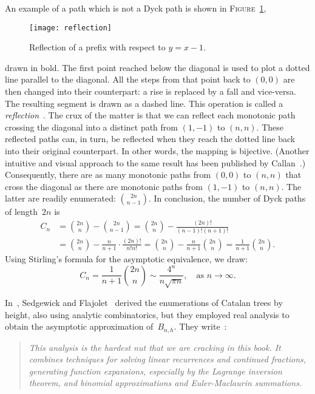 \documentclass[11pt]{article}
\newcommand\fig{\textsc{Figure}}
\begin{document}
An example of a path which is not a Dyck path is shown in
\fig~\ref{fig:reflection},
\begin{figure}[b]
\centering
\texttt{[image: reflection]}
\caption{Reflection of a prefix with respect to \(y = x - 1\).\label{fig:reflection}}
\end{figure}
drawn in bold. The first point reached below the diagonal is used to
plot a dotted line parallel to the diagonal. All the steps from that
point back to \((0,0)\) are then changed into their counterpart: a
rise is replaced by a fall and vice-versa. The resulting segment is
drawn as a dashed line. This operation is called a
\emph{reflection}~\cite{Renault:2008}. The crux of the matter is that
we can reflect each monotonic path crossing the diagonal into a
distinct path from \((1,-1)\) to \((n,n)\). These reflected paths can,
in turn, be reflected when they reach the dotted line back into their
original counterpart. In other words, the mapping is
bijective. (Another intuitive and visual approach to the same result
has been published by Callan~\cite{Callan_1995}.) Consequently, there
are as many monotonic paths from \((0,0)\) to \((n,n)\) that cross the
diagonal as there are monotonic paths from \((1,-1)\) to
\((n,n)\). The latter are readily enumerated: \(\binom{2n}{n-1}\). In
conclusion, the number of Dyck paths of length~\(2n\) is
\begin{align*}
C_n &= \binom{2n}{n} - \binom{2n}{n-1}
= \binom{2n}{n} - \frac{(2n)!}{(n-1)!(n+1)!}\\
&= \binom{2n}{n} - \frac{n}{n+1} \cdot \frac{(2n)!}{n!n!}
 = \binom{2n}{n} - \frac{n}{n+1} \binom{2n}{n} = \frac{1}{n+1}\binom{2n}{n}.
\end{align*}
Using Stirling's formula for the asymptotic equivalence, we draw:
\begin{equation}
C_n = \frac{1}{n+1}\binom{2n}{n} \sim \frac{4^n}{n\sqrt{\pi n}},
      \quad\text{as \(n \rightarrow \infty\)}.
\label{eq:Cn}
\end{equation}

In~, Sedgewick and
Flajolet~\cite{SedgewickFlajolet:1996,FlajoletSedgewick:2009} derived
the enumerations of Catalan trees by height, also using analytic
combinatorics, but they employed real analysis to obtain the
asymptotic approximation of~\(B_{n,h}\). They
write~\cite[p.~260]{SedgewickFlajolet:1996}:
\begin{quote}
\it This analysis is the hardest nut that we are cracking in this
book. It combines techniques for solving linear recurrences and
continued fractions, generating function expansions, especially by the
Lagrange inversion theorem, and binomial approximations and
Euler\--Maclaurin summations.
\end{quote}
\end{document}
